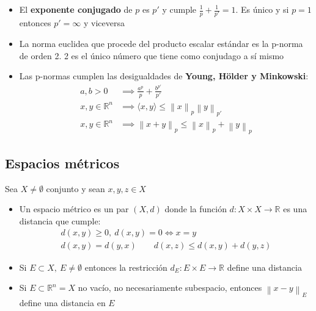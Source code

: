 \documentclass[a4paper,twocolumn]{extarticle}
\newcommand{\R}{\mathbb{R}}
\newcommand{\norma}[1]{\left\lVert#1\right\rVert}
\newcommand{\dotprod}[1]{\langle #1 \rangle}
\begin{document}
\begin{itemize}
	\begin{itemize}
		\item El \textbf{exponente conjugado} de $p$ es $p'$ y cumple $\frac{1}{p} + \frac{1}{p'} = 1$. Es único y si $p = 1$ entonces $p' = \infty$ y viceversa
		\item La norma euclidea que procede del producto escalar estándar es la p-norma de orden 2. 2 es el único número que tiene como conjudago a sí mismo
		\item Las p-normas cumplen las desigualdades de \textbf{Young, Hölder y Minkowski}:
		\begin{align*}
			a,b > 0 &\implies \frac{a^p}{p} + \frac{b^{p'}}{p'} \\
			x,y \in \R^n &\implies \dotprod{x,y} \leq \norma{x}_p \norma{y}_{p'} \\
			x,y \in \R^n &\implies \norma{x+y}_p \leq \norma{x}_p + \norma{y}_p
		\end{align*}
	\end{itemize}
\end{itemize}

\subsection{Espacios métricos}

Sea $X \neq \emptyset$ conjunto y sean $x, y, z \in X$
\begin{itemize}
	\item Un espacio métrico es un par $(X, d)$ donde la función $d:X \times X \to \R$ es una distancia que cumple:
	\begin{align*}
		d(x,y) \geq 0,\ d(x,y) = 0 \iff x = y \\
		d(x,y) = d(y,x) \qquad d(x,z) \leq d(x,y) + d(y,z)
	\end{align*}
	\item Si $E \subset X,\ E \neq \emptyset$ entonces la restricción $d_E: E \times E \to \R$ define una distancia
	\item Si $E \subset \R^n = X$ no vacío, no necesariamente subespacio, entonces $\norma{x - y}_E$ define una distancia en $E$
\end{itemize}
\end{document}
